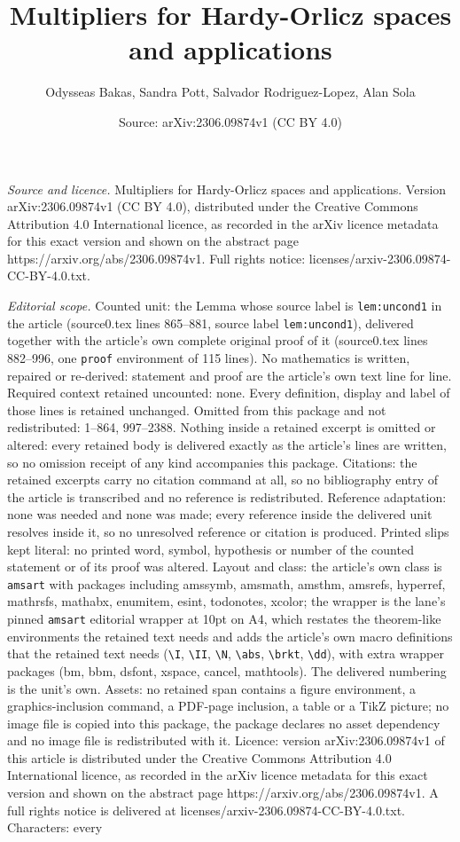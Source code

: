 \documentclass[10pt,a4paper]{amsart}
\title[Multipliers for Hardy-Orlicz spaces and applications]{Multipliers for Hardy-Orlicz spaces and applications}
\author{Odysseas Bakas, Sandra Pott, Salvador Rodriguez-Lopez, Alan Sola}
\date{Source: arXiv:2306.09874v1 (CC BY 4.0)}
\begin{document}
\maketitle

\noindent\emph{Source and licence.} Multipliers for Hardy-Orlicz spaces and applications. Version arXiv:2306.09874v1 (CC BY 4.0), distributed under the Creative Commons Attribution 4.0 International licence, as recorded in the arXiv licence metadata for this exact version and shown on the abstract page https://arxiv.org/abs/2306.09874v1. Full rights notice: licenses/arxiv-2306.09874-CC-BY-4.0.txt.\par\smallskip

\noindent\textit{Editorial scope.} Counted unit: the Lemma whose source label is \texttt{lem:uncond1} in the article (source0.tex lines 865--881, source label \texttt{lem:uncond1}), delivered together with the article's own complete original proof of it (source0.tex lines 882--996, one \texttt{proof} environment of 115 lines). No mathematics is written, repaired or re-derived: statement and proof are the article's own text line for line. Required context retained uncounted: none. Every definition, display and label of those lines is retained unchanged. Omitted from this package and not redistributed: 1--864, 997--2388. Nothing inside a retained excerpt is omitted or altered: every retained body is delivered exactly as the article's lines are written, so no omission receipt of any kind accompanies this package. Citations: the retained excerpts carry no citation command at all, so no bibliography entry of the article is transcribed and no reference is redistributed. Reference adaptation: none was needed and none was made; every reference inside the delivered unit resolves inside it, so no unresolved reference or citation is produced. Printed slips kept literal: no printed word, symbol, hypothesis or number of the counted statement or of its proof was altered. Layout and class: the article's own class is \texttt{amsart} with packages including amssymb, amsmath, amsthm, amsrefs, hyperref, mathrsfs, mathabx, enumitem, esint, todonotes, xcolor; the wrapper is the lane's pinned \texttt{amsart} editorial wrapper at 10pt on A4, which restates the theorem-like environments the retained text needs and adds the article's own macro definitions that the retained text needs (\texttt{\textbackslash I}, \texttt{\textbackslash II}, \texttt{\textbackslash N}, \texttt{\textbackslash abs}, \texttt{\textbackslash brkt}, \texttt{\textbackslash dd}), with extra wrapper packages (bm, bbm, dsfont, xspace, cancel, mathtools). The delivered numbering is the unit's own. Assets: no retained span contains a figure environment, a graphics-inclusion command, a PDF-page inclusion, a table or a TikZ picture; no image file is copied into this package, the package declares no asset dependency and no image file is redistributed with it. Licence: version arXiv:2306.09874v1 of this article is distributed under the Creative Commons Attribution 4.0 International licence, as recorded in the arXiv licence metadata for this exact version and shown on the abstract page https://arxiv.org/abs/2306.09874v1. A full rights notice is delivered at licenses/arxiv-2306.09874-CC-BY-4.0.txt. Characters: every 
\end{document}
